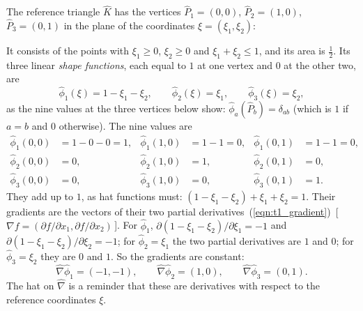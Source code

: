 The reference triangle $\hat K$ has the vertices $\hat P_1 = (0, 0)$, $\hat P_2 = (1, 0)$, $\hat P_3 = (0, 1)$ in the plane of the coordinates $\xi = (\xi_1, \xi_2)$:
\begin{center}
\end{center}
It consists of the points with $\xi_1 \geq 0$, $\xi_2 \geq 0$ and $\xi_1 + \xi_2 \leq 1$, and its area is $\frac12$. Its three linear \emph{shape functions}, each equal to $1$ at one vertex and $0$ at the other two, are
\begin{equation}
\label{eqn:shape}
\hat\phi_1(\xi) = 1 - \xi_1 - \xi_2, \qquad \hat\phi_2(\xi) = \xi_1, \qquad \hat\phi_3(\xi) = \xi_2,
\end{equation}
as the nine values at the three vertices below show: $\hat \phi_a(\hat P_b) = \delta_{ab}$ (which is $1$ if $a = b$ and $0$ otherwise). The nine values are
\begin{align*}
\hat\phi_1(0,0) &= 1 - 0 - 0 = 1, & \hat\phi_1(1,0) &= 1 - 1 = 0, & \hat\phi_1(0,1) &= 1 - 1 = 0, \\
\hat\phi_2(0,0) &= 0, & \hat\phi_2(1,0) &= 1, & \hat\phi_2(0,1) &= 0, \\
\hat\phi_3(0,0) &= 0, & \hat\phi_3(1,0) &= 0, & \hat\phi_3(0,1) &= 1 .
\end{align*}
They add up to $1$, as hat functions must: $(1 - \xi_1 - \xi_2) + \xi_1 + \xi_2 = 1$. Their gradients are the vectors of their two partial derivatives~(\ref{eqn:t1_gradient})~[\,$\nabla f = (\partial f/\partial x_1, \partial f/\partial x_2)$\,]. For $\hat\phi_1$, $\partial(1 - \xi_1 - \xi_2)/\partial\xi_1 = -1$ and $\partial(1 - \xi_1 - \xi_2)/\partial\xi_2 = -1$; for $\hat\phi_2 = \xi_1$ the two partial derivatives are $1$ and $0$; for $\hat\phi_3 = \xi_2$ they are $0$ and $1$. So the gradients are constant:
\begin{equation}
\label{eqn:shape_gradients}
\hat \nabla \hat\phi_1 = (-1, -1), \qquad \hat \nabla \hat\phi_2 = (1, 0), \qquad \hat \nabla \hat\phi_3 = (0, 1).
\end{equation}
The hat on $\hat\nabla$ is a reminder that these are derivatives with respect to the reference coordinates $\xi$.

